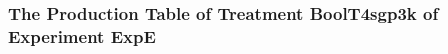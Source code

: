  \begin{frame}
 \fontsize{8pt}{9pt}\selectfont
 \frametitle{ The Production Table of Treatment BoolT4sgp3k of Experiment ExpE }

 \label{ExpEGrammarTable001.tex}  
 \end{frame}

